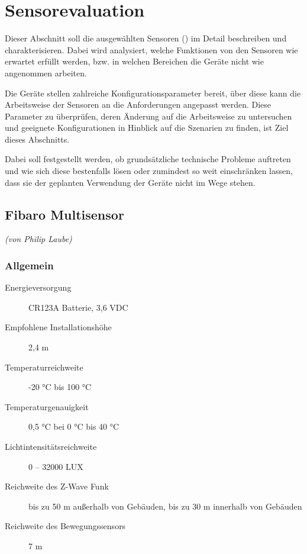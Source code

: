 \section{Sensorevaluation}
Dieser Abschnitt soll die ausgewählten Sensoren () im Detail beschreiben und charakterisieren. Dabei wird analysiert, welche Funktionen von den Sensoren wie erwartet erfüllt werden, bzw. in welchen Bereichen die Geräte nicht wie angenommen arbeiten.

Die Geräte stellen zahlreiche Konfigurationsparameter bereit, über diese kann die Arbeitsweise der Sensoren an die Anforderungen angepasst werden. Diese Parameter zu überprüfen, deren Änderung auf die Arbeitsweise zu untersuchen und geeignete Konfigurationen in Hinblick auf die Szenarien zu finden, ist Ziel dieses Abschnitts.

Dabei soll festgestellt werden, ob grundsätzliche technische Probleme auftreten und wie sich diese bestenfalls lösen oder zumindest so weit einschränken lassen, dass sie der geplanten Verwendung der Geräte nicht im Wege stehen.


\subsection{Fibaro Multisensor}
\emph{(von Philip Laube)}

\subsubsection{Allgemein}

\begin{description}
	\item[Energieversorgung] CR123A Batterie, 3,6 VDC
	\item[Empfohlene Installationshöhe] 2,4 m
	\item[Temperaturreichweite] -20 °C bis 100 °C
	\item[Temperaturgenauigkeit] 0,5 °C bei 0 °C bis 40 °C
	\item[Lichtintensitätsreichweite] 0 – 32000 LUX
	\item[Reichweite des Z-Wave Funk] bis zu 50 m außerhalb von Gebäuden, bis zu 30 m innerhalb von Gebäuden
	\item[Reichweite des Bewegungssensors] 7 m
\end{description}

